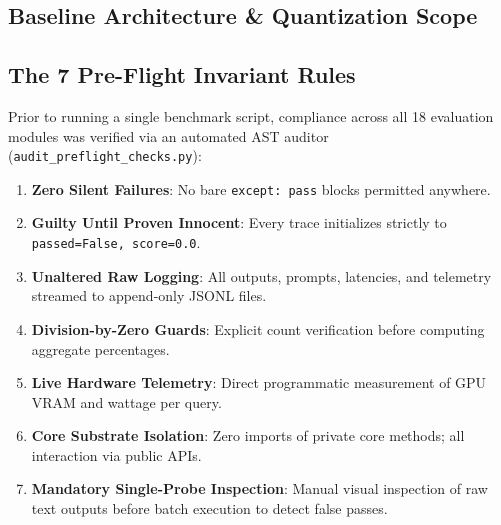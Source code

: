 \documentclass[11pt,a4paper]{article}
\begin{document}
\subsection{Baseline Architecture \& Quantization Scope}

\subsection{The 7 Pre-Flight Invariant Rules}
Prior to running a single benchmark script, compliance across all 18 evaluation modules was verified via an automated AST auditor (\nolinkurl{audit_preflight_checks.py}):
\begin{enumerate}[leftmargin=1.5em, itemsep=1pt, topsep=1pt]
  \item \textbf{Zero Silent Failures}: No bare \texttt{except: pass} blocks permitted anywhere.
  \item \textbf{Guilty Until Proven Innocent}: Every trace initializes strictly to \texttt{passed=False, score=0.0}.
  \item \textbf{Unaltered Raw Logging}: All outputs, prompts, latencies, and telemetry streamed to append-only JSONL files.
  \item \textbf{Division-by-Zero Guards}: Explicit count verification before computing aggregate percentages.
  \item \textbf{Live Hardware Telemetry}: Direct programmatic measurement of GPU VRAM and wattage per query.
  \item \textbf{Core Substrate Isolation}: Zero imports of private core methods; all interaction via public APIs.
  \item \textbf{Mandatory Single-Probe Inspection}: Manual visual inspection of raw text outputs before batch execution to detect false passes.
\end{enumerate}
\end{document}
